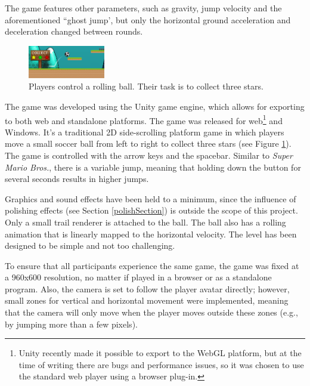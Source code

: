 The game features other parameters, such as gravity, jump velocity and the aforementioned ``ghost jump', but only the horizontal ground acceleration and deceleration changed between rounds.

\begin{figure}[htbp]
\centering
\includegraphics[width=0.3\textwidth]{Pics/gf}
\caption{Players control a rolling ball. Their task is to collect three stars.}
\label{fig:game}
\end{figure}

The game was developed using the Unity game engine, which allows for exporting to both web and standalone platforms. The game was released for web\footnote{Unity recently made it possible to export to the WebGL platform, but at the time of writing there are bugs and performance issues, so it was chosen to use the standard web player using a browser plug-in.} and Windows. It's a traditional 2D side-scrolling platform game in which players move a small soccer ball from left to right to collect three stars (see Figure \ref{fig:game}). The game is controlled with the arrow keys and the spacebar. Similar to \textit{Super Mario Bros.}, there is a variable jump, meaning that holding down the button for several seconds results in higher jumps.

Graphics and sound effects have been held to a minimum, since the influence of polishing effects (see Section \ref{polishSection}) is outside the scope of this project. Only a small trail renderer is attached to the ball. The ball also has a rolling animation that is linearly mapped to the horizontal velocity. The level has been designed to be simple and not too challenging.

To ensure that all participants experience the same game, the game was fixed at a 960x600 resolution, no matter if played in a browser or as a standalone program. Also, the camera is set to follow the player avatar directly; however, small zones for vertical and horizontal movement were implemented, meaning that the camera will only move when the player moves outside these zones (e.g., by jumping more than a few pixels).